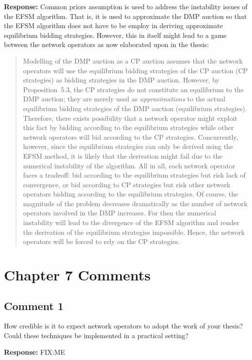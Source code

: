 \documentclass[10pt,a4paper,notitlepage]{article}
\numberwithin{equation}{section}
\begin{document}
\textbf{Response:}
Common priors assumption is used to address the instability issues of the EFSM algorithm. That is, it is used to approximate the DMP auction so that the EFSM algorithm does not have to be employ in deriving approximate equilibrium bidding strategies. However, this in itself might lead to a game between the network operators as now elaborated upon in the thesis:
\begin{quote}
Modelling of the DMP auction as a CP auction assumes that the network operators will use the equilibrium bidding strategies of the CP auction (CP strategies) as bidding strategies in the DMP auction. However, by Proposition~5.3, the CP strategies do not constitute an equilibrium to the DMP auction; they are merely used as \emph{approximations} to the actual equilibrium bidding strategies of the DMP auction (equilibrium strategies). Therefore, there exists possibility that a network operator might exploit this fact by bidding according to the equilibrium strategies while other network operators will bid according to the CP strategies. Concurrently, however, since the equilibrium strategies can only be derived using the EFSM method, it is likely that the derivation might fail due to the numerical instability of the algorithm. All in all, each network operator faces a tradeoff: bid according to the equilibrium strategies but risk lack of convergence, or bid according to CP strategies but risk other network operators bidding according to the equilibrium strategies. Of course, the magnitude of the problem decreases dramatically as the number of network operators involved in the DMP increases. For then the numerical instability will lead to the divergence of the EFSM algorithm and render the derivation of the equilibrium strategies impossible. Hence, the network operators will be forced to rely on the CP strategies.
\end{quote}

\clearpage

\section{Chapter 7 Comments}
\subsection{Comment 1}
How credible is it to expect network operators to adopt the work of your thesis? Could these techniques be implemented in a practical setting?

\textbf{Response:}
FIX:ME
\end{document}
